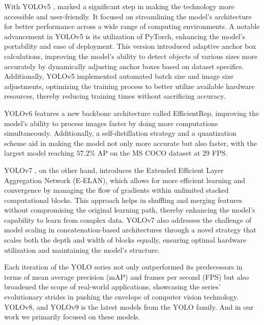 With YOLOv5 \cite{Jocher2020YOLOv5}, marked a significant step in making the technology more accessible and user-friendly. It focused on streamlining the model's architecture for better performance across a wide range of computing environments. A notable advancement in YOLOv5 is its utilization of PyTorch, enhancing the model's portability and ease of deployment. This version introduced adaptive anchor box calculations, improving the model's ability to detect objects of various sizes more accurately by dynamically adjusting anchor boxes based on dataset specifics. Additionally, YOLOv5 implemented automated batch size and image size adjustments, optimizing the training process to better utilize available hardware resources, thereby reducing training times without sacrificing accuracy.

YOLOv6 \cite{li2022yolov6} features a new backbone architecture called EfficientRep, improving the model's ability to process images faster by doing more computations simultaneously. Additionally, a self-distillation strategy and a quantization scheme aid in making the model not only more accurate but also faster, with the largest model reaching $57.2\%$ AP on the MS COCO dataset at 29 FPS.

YOLOv7 \cite{wang2023yolov7}, on the other hand, introduces the Extended Efficient Layer Aggregation Network (E-ELAN), which allows for more efficient learning and convergence by managing the flow of gradients within unlimited stacked computational blocks. This approach helps in shuffling and merging features without compromising the original learning path, thereby enhancing the model's capability to learn from complex data. YOLOv7 also addresses the challenge of model scaling in concatenation-based architectures through a novel strategy that scales both the depth and width of blocks equally, ensuring optimal hardware utilization and maintaining the model's structure. 


Each iteration of the YOLO series not only outperformed its predecessors in terms of mean average precision (mAP) and frames per second (FPS) but also broadened the scope of real-world applications, showcasing the series' evolutionary strides in pushing the envelope of computer vision technology. YOLOv8, and YOLOv9 is the latest models from the YOLO family. And in our work we primarily focused on these models.




